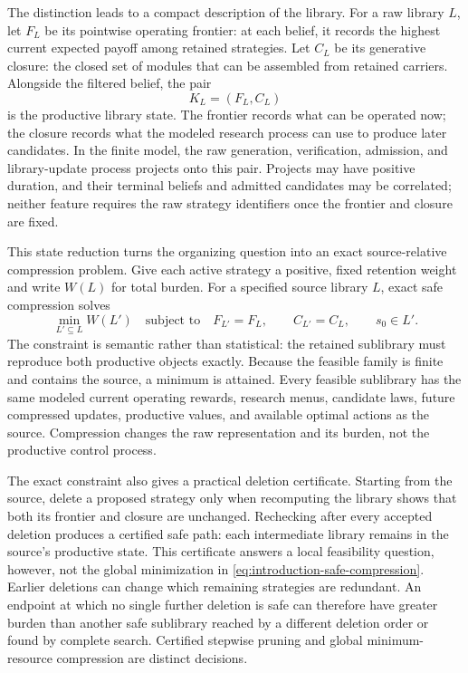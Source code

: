 The distinction leads to a compact description of the library. For a raw
library \(L\), let \(F_L\) be its pointwise operating frontier: at each belief,
it records the highest current expected payoff among retained strategies. Let
\(C_L\) be its generative closure: the closed set of modules that can be
assembled from retained carriers. Alongside the filtered belief, the pair
\begin{equation}\label{eq:introduction-productive-state}
  K_L=(F_L,C_L)
\end{equation}
is the productive library state. The frontier records what can be operated
now; the closure records what the modeled research process can use to produce
later candidates. In the finite model, the raw generation, verification,
admission, and library-update process projects onto this pair. Projects may
have positive duration, and their terminal beliefs and admitted candidates may
be correlated; neither feature requires the raw strategy identifiers once the
frontier and closure are fixed.

This state reduction turns the organizing question into an exact
source-relative compression problem. Give each active strategy a positive,
fixed retention weight and write \(W(L)\) for total burden. For a specified
source library \(L\), exact safe compression solves
\begin{equation}\label{eq:introduction-safe-compression}
  \min_{L'\subseteq L} W(L')
  \quad\text{subject to}\quad
  F_{L'}=F_L,\qquad C_{L'}=C_L,
  \qquad s_0\in L'.
\end{equation}
The constraint is semantic rather than statistical: the retained sublibrary
must reproduce both productive objects exactly. Because the feasible family
is finite and contains the source, a minimum is attained. Every feasible
sublibrary has the same modeled current operating rewards, research menus,
candidate laws, future compressed updates, productive values, and available
optimal actions as the source. Compression changes the raw representation and
its burden, not the productive control process.

The exact constraint also gives a practical deletion certificate. Starting
from the source, delete a proposed strategy only when recomputing the library
shows that both its frontier and closure are unchanged. Rechecking after every
accepted deletion produces a certified safe path: each intermediate library
remains in the source's productive state. This certificate answers a local
feasibility question, however, not the global minimization in
\eqref{eq:introduction-safe-compression}. Earlier deletions can change which
remaining strategies are redundant. An endpoint at which no single further
deletion is safe can therefore have greater burden than another safe
sublibrary reached by a different deletion order or found by complete search.
Certified stepwise pruning and global minimum-resource compression are
distinct decisions.

